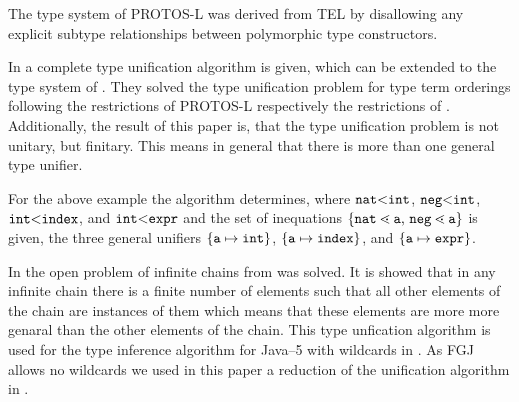 The type system of \textsf{PROTOS-L} \cite{CB95} was
derived from \textsf{TEL} by disallowing any explicit subtype relationships
between polymorphic type constructors. 

In \cite{CB95}
a complete type unification algorithm is given, which can be extended to the
type system of \cite{HiTo92}. They solved the type unification problem for type
term orderings following the restrictions of \textsf{PROTOS-L} respectively the
restrictions of \cite{HiTo92}. Additionally, the result of this paper is, that
the type unification problem is not unitary, but finitary. This means in
general that there is more than one general type unifier. 

For the above example the algorithm determines, where $\texttt{nat} \mbox{$<$}
\texttt{int}$, $\texttt{neg} \mbox{$<$} \texttt{int}$, $\mathtt{int} \mbox{$<$}
\mathtt{index}$, and $\mathtt{int} \mbox{$<$} \mathtt{expr}$ and the set of
inequations $\set{\mathtt{nat} \lessdot
  \mathtt{a}$, $\mathtt{neg} \lessdot \mathtt{a}}$ is given, the three general
unifiers $\{ \mathtt{a} \mapsto \texttt{int} \}$, $\{ \mathtt{a} \mapsto
  \mathtt{index} \}$, and $\{ \mathtt{a} \mapsto \mathtt{expr} \}$. 

In \cite{plue09_1} the open problem of infinite chains from \cite{GS89} was
solved. It is showed that in any infinite chain there is a finite number of elements such that
all other elements of the chain are instances of them which means that these
elements are more more genaral than the other elements of the chain. This type
unfication algorithm is used for the type inference algorithm for Java--5 with
wildcards in \cite{Plue07_3}. As FGJ allows no wildcards we used in this paper
a reduction  of the unification algorithm in \cite{plue09_1}.



